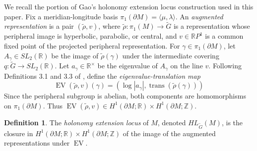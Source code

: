 \documentclass{article}
\theoremstyle{plain}
\theoremstyle{definition}
\newtheorem{definition}[theorem]{Definition}
\theoremstyle{plain}
\theoremstyle{plain}
\theoremstyle{plain}
\theoremstyle{remark}
\theoremstyle{remark}
\theoremstyle{plain}
\theoremstyle{plain}
\theoremstyle{plain}
\theoremstyle{plain}
\begin{document}
We recall the portion of Gao's holonomy extension locus construction used in this paper. Fix a meridian-longitude basis $\pi_1(\partial M)=\langle\mu,\lambda\rangle$. An \emph{augmented representation} is a pair $(\widetilde\rho,v)$, where $\widetilde\rho:\pi_1(M)\longrightarrow\widetilde G$ is a representation whose peripheral image is hyperbolic, parabolic, or central, and $v\in\mathbb RP^1$ is a common fixed point of the projected peripheral representation. For $\gamma\in\pi_1(\partial M)$, let $A_\gamma\in SL_2(\mathbb R)$ be the image of $\widetilde\rho(\gamma)$ under the intermediate covering $q: \widetilde G\longrightarrow SL_2(\mathbb R)$. Let $a_\gamma\in\mathbb R^\times$ be the eigenvalue of $A_\gamma$ on the line $v$. Following Definitions 3.1 and 3.3 of \cite{gao}, define the \emph{eigenvalue-translation map} 
\begin{equation*}
	\operatorname{EV}(\widetilde\rho,v)(\gamma) = \left(\log|a_\gamma|, \operatorname{trans}(\widetilde\rho(\gamma))\right)
\end{equation*}
Since the peripheral subgroup is abelian, both components are homomorphisms on $\pi_1(\partial M)$. Thus $\operatorname{EV}(\widetilde\rho,v) \in H^1(\partial M;\mathbb R) \times H^1(\partial M;\mathbb Z)$. 

\begin{definition}
The \emph{holonomy extension locus} of $M$, denoted $HL_{\widetilde{G}}(M)$, is the closure in $H^1(\partial M; \mathbb{R}) \times H^1(\partial M; \mathbb{Z})$ of the image of the augmented representations under $\operatorname{EV}$.
\end{definition}
\end{document}
